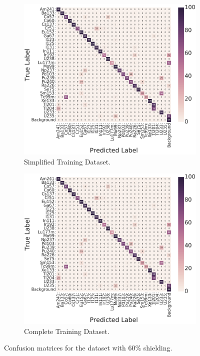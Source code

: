 \begin{figure}[H]
     \begin{subfigure}[b]{0.49\textwidth}
         \centering
         \includegraphics[width=\textwidth]{model_choice_hyperparameter_search_images/conf_matrix_example.png}
         \caption{Simplified Training Dataset.}
         \label{fig:results_easy_distance_comparison_simple}
     \end{subfigure}
     \hfill
     \begin{subfigure}[b]{0.49\textwidth}
         \centering
         \includegraphics[width=\textwidth]{model_choice_hyperparameter_search_images/conf_matrix_example.png}
         \caption{Complete Training Dataset.}
         \label{fig:results_easy_distance_comparison_full}
     \end{subfigure}
     
        \caption{Confusion matrices for the dataset with 60\% shielding.}
        \label{fig:results_easy_distance_comparison}
\end{figure}



